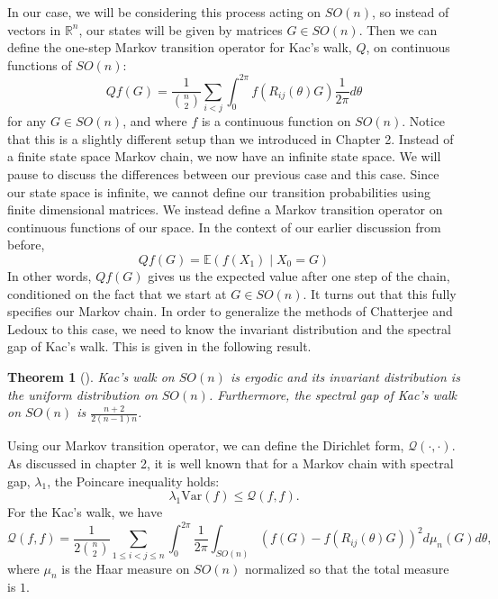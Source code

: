 \documentclass[12pt]{report}
\newtheorem{thm}{Theorem}[section]
\newcommand{\Dform}[2]{\mathcal{Q}\left(#1,#2 \right)}
\theoremstyle{definition}
\begin{document}
In our case, we will be considering this process acting on $SO(n)$, so instead of vectors in $\mathbb{R}^n$, our states will be given by matrices $G\in SO(n)$.  Then we can define the one-step Markov transition operator for Kac's walk, $Q$, on continuous functions of $SO(n)$:
\begin{equation} 
	Qf(G) = \frac{1}{\binom{n}{2}} \sum_{i<j} \int_0^{2\pi} f(R_{ij}(\theta)G)\frac{1}{2\pi} d\theta
\end{equation}
for any $G\in SO(n)$, and where $f$ is a continuous function on $SO(n)$. Notice that this is a slightly different setup than we introduced in Chapter 2.  Instead of a finite state space Markov chain, we now have an infinite state space.  We will pause to discuss the differences between our previous case and this case. Since our state space is infinite, we cannot define our transition probabilities using finite dimensional matrices.  We instead define a Markov transition operator on continuous functions of our space.  In the context of our earlier discussion from before, 
$$
Qf(G)=\mathbb{E}(f(X_1)\; | \; X_0=G)
$$
In other words, $Qf(G)$ gives us the expected value after one step of the chain, conditioned on the fact that we start at $G\in SO(n)$.  It turns out that this fully specifies our Markov chain.  In order to generalize the methods of Chatterjee and Ledoux to this case, we need to know the invariant distribution and the spectral gap of  Kac's walk.  This is given in the following result.

\begin{thm}[\cite{CarlenCarvalhoLoss,Maslen}]
	Kac's walk on $SO(n)$ is ergodic and its invariant distribution is the uniform distribution on $SO(n)$. Furthermore, the spectral gap of Kac's walk on $SO(n)$ is $\frac{n+2}{2(n-1)n}$.
\end{thm}
Using our Markov transition operator, we can define the Dirichlet form, $\Dform{\cdot}{\cdot}$. As discussed in chapter 2, it is well known that for a Markov chain with spectral gap, $\lambda_1$, the Poincare inequality holds:
\begin{equation*}
	\lambda_1 \mathrm{Var}(f) \leq \Dform{f}{f}.
\end{equation*}
For the Kac's walk, we have 
\begin{equation*}
	\Dform{f}{f} = \frac 1 {2\binom{n}{2}} \sum_{1 \leq i<j\leq n} \int_0^{2\pi} \frac{1}{2\pi} \int_{SO(n)} \left(f(G) - f(R_{ij}(\theta)G)\right)^2 d\mu_n(G) d\theta,
\end{equation*}
where $\mu_n$ is the Haar measure on $SO(n)$ normalized so that the total measure is $1$.
\end{document}
